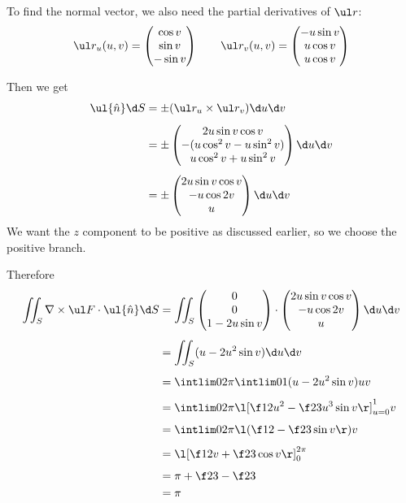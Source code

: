 \documentclass[a4paper]{article}
\begin{document}
To find the normal vector, we also need the partial derivatives of $\ul r$: \[
\ul r_u(u, v) = \begin{pmatrix} \cos v \\ \sin v \\ - \sin v \end{pmatrix}
\qquad \ul r_v(u, v) = \begin{pmatrix} -u \sin v \\ u \cos v \\ u \cos v \end{pmatrix}
\]

Then we get \begin{align*}
\ul{\hat n} \d S &= \pm (\ul r_u \times \ul r_v) \d u \d v \\[1ex]
&= \pm \begin{pmatrix} 2u \sin v \cos v \\ -(u \cos^2 v - u \sin^2 v) \\ u \cos^2 v + u \sin^2 v \end{pmatrix} \d u \d v \\[1ex]
&= \pm \begin{pmatrix} 2u \sin v \cos v \\ -u \cos 2v \\ u \end{pmatrix} \d u \d v
\end{align*}
We want the $z$ component to be positive as discussed earlier, so we choose the positive branch.

Therefore \begin{align*}
\iint_S \nabla \times \ul F \cdot \ul{\hat n} \d S &= \iint_S \begin{pmatrix} 0 \\ 0 \\ 1 - 2u \sin v \end{pmatrix} \cdot \begin{pmatrix} 2u \sin v \cos v \\ -u \cos 2v \\ u \end{pmatrix} \d u \d v \\[1ex]
&= \iint_S (u - 2 u^2 \sin v) \d u \d v \\[1ex]
&= \intlim 0{2\pi} {\intlim 01 {(u - 2 u^2 \sin v)} u} v \\[1ex]
&= \intlim 0{2\pi} {{\l[ \f12 u^2 - \f23 u^3 \sin v \r]}_{u=0}^1} v \\[1ex]
&= \intlim 0{2\pi} {\l( \f12 - \f23 \sin v \r)} v \\[1ex]
&= {\l[ \f12 v + \f23 \cos v \r]}_0^{2\pi} \\[1ex]
&= \pi + \f23 - \f23 \\
&= \pi
\end{align*}
\end{document}
